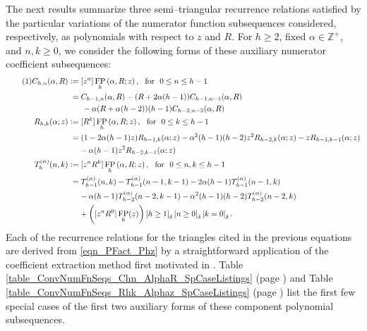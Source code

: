 \documentclass[12pt,reqno]{article}
\numberwithin{sfootnote}{section}
\newcommand{\tableref}[1]{Table \ref{#1} (page \pageref{#1})}
\numberwithin{equation}{section}
\newcommand{\tagonce}[0]{
     \addtocounter{equation}{1}
     \tag{\theequation}
}
\theoremstyle{DefaultTheoremStyle}
\theoremstyle{definition}
\newcommand{\defequals}{\ensuremath{\vcentcolon=}}
\newcommand{\Iverson}[1]{\ensuremath{\left[#1\right]_{\delta}}}
\newcommand{\ConvFP}[4]{\ensuremath{\FP_{#1}\left(#2, #3; #4\right)}}
\DeclareMathOperator{\FP}{FP}
\begin{document}
The next results summarize three semi--triangular 
recurrence relations satisfied by the 
particular variations of the numerator function subsequences considered, 
respectively, as polynomials with respect to $z$ and $R$. 
For $h \geq 2$, fixed $\alpha \in \mathbb{Z}^{+}$, and 
$n, k \geq 0$, we consider the following forms of these auxiliary 
numerator coefficient subsequences: 
\begin{align*} 
\tagonce\label{eqn_Chk_aux_numerator_subseqs-def_v1}
C_{h,n}(\alpha, R) & \defequals [z^n] \ConvFP{h}{\alpha}{R}{z},\ 
       \text{ for \ } 
       0 \leq n \leq h-1 \\ 
       & \phantom{:} = 
C_{h-1,n}(\alpha, R) - (R+2\alpha(h-1)) C_{h-1,n-1}(\alpha, R) \\ 
     & \phantom{= \quad} - 
     \alpha(R+\alpha(h-2))(h-1) C_{h-2,n-2}(\alpha, R) \\ 
R_{h,k}(\alpha; z) & \defequals [R^k] \ConvFP{h}{\alpha}{R}{z},\ 
       \text{ for \ } 
       0 \leq k \leq h-1 \\ 
       & \phantom{:} = 
     (1-2\alpha(h-1)z)R_{h-1,k}(\alpha; z) - 
     \alpha^2(h-1)(h-2)z^2 R_{h-2,k}(\alpha; z) - 
     zR_{h-1,k-1}(\alpha; z) \\ 
       & \phantom{\defequals\ }  
     - \alpha(h-1)z^2 R_{h-2,k-1}(\alpha; z) \\ 
T_h^{(\alpha)}(n, k) & \defequals [z^n R^k] \ConvFP{h}{\alpha}{R}{z},\ 
       \text{ for \ } 
       0 \leq n, k \leq h-1 \\ 
       & \phantom{:}= 
T_{h-1}^{(\alpha)}(n, k) -T_{h-1}^{(\alpha)}(n-1, k-1) - 
     2\alpha (h-1) T_{h-1}^{(\alpha)}(n-1 ,k) \\ 
   & \phantom{\defequals\ } - 
     \alpha (h-1) T_{h-2}^{(\alpha)}(n-2, k-1) - 
     \alpha^2 (h-1)(h-2) T_{h-2}^{(\alpha)}(n-2, k) \\ 
   & \phantom{\defequals\ } + 
     \left([z^n R^0] \FP_h(z)\right) 
     \Iverson{h \geq 1} \Iverson{n \geq 0} \Iverson{k = 0}. 
\end{align*} 
Each of the recurrence relations for the triangles 
cited in the previous equations 
are derived from \eqref{eqn_PFact_Phz} by a 
straightforward application of the coefficient extraction method 
first motivated in \citep{MULTIFACTJIS}. 
\tableref{table_ConvNumFnSeqs_Chn_AlphaR_SpCaseListings} and 
\tableref{table_ConvNumFnSeqs_Rhk_Alphaz_SpCaseListings} 
list the first few special cases of the first two 
auxiliary forms of these component polynomial subsequences. 
\end{document}
